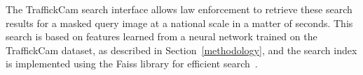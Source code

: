 The TraffickCam search interface allows law enforcement to retrieve these search results for a masked query image at a national scale in a matter of seconds. This search is based on features learned from a neural network trained on the TraffickCam dataset, as described in Section~\ref{methodology}, and the search index is implemented using the Faiss library for efficient search~\cite{faiss}.